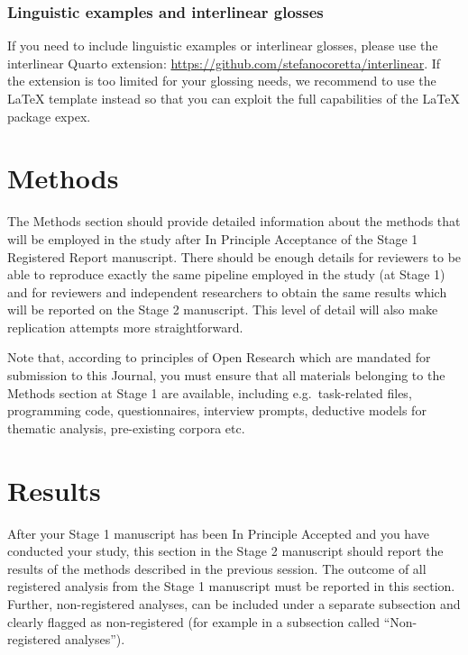 \documentclass[
]{rrling}
\begin{document}
\subsubsection{Linguistic examples and interlinear
glosses}\label{linguistic-examples-and-interlinear-glosses}

If you need to include linguistic examples or interlinear glosses,
please use the interlinear Quarto extension:
\url{https://github.com/stefanocoretta/interlinear}. If the extension is
too limited for your glossing needs, we recommend to use the LaTeX
template instead so that you can exploit the full capabilities of the
LaTeX package expex.

\section{Methods}\label{methods}

The Methods section should provide detailed information about the
methods that will be employed in the study after In Principle Acceptance
of the Stage 1 Registered Report manuscript. There should be enough
details for reviewers to be able to reproduce exactly the same pipeline
employed in the study (at Stage 1) and for reviewers and independent
researchers to obtain the same results which will be reported on the
Stage 2 manuscript. This level of detail will also make replication
attempts more straightforward.

Note that, according to principles of Open Research which are mandated
for submission to this Journal, you must ensure that all materials
belonging to the Methods section at Stage 1 are available, including
e.g.~task-related files, programming code, questionnaires, interview
prompts, deductive models for thematic analysis, pre-existing corpora
etc.

\section{Results}\label{results}

After your Stage 1 manuscript has been In Principle Accepted and you
have conducted your study, this section in the Stage 2 manuscript should
report the results of the methods described in the previous session. The
outcome of all registered analysis from the Stage 1 manuscript must be
reported in this section. Further, non-registered analyses, can be
included under a separate subsection and clearly flagged as
non-registered (for example in a subsection called ``Non-registered
analyses'').
\end{document}
